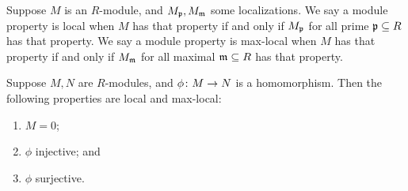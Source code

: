 \begin{definition}
    Suppose \(M\) is an \(R\)-module, and \(M_{\mathfrak{p}},M_{\mathfrak{m}}\) some localizations.
    We say a module property is local when
    \(M\) has that property if and only if \(M_{\mathfrak{p}}\) for all prime \(\mathfrak{p} \subseteq R\) has that property.
    We say a module property is max-local when
    \(M\) has that property if and only if \(M_{\mathfrak{m}}\) for all maximal \(\mathfrak{m} \subseteq R\) has that property.
\end{definition}
\begin{lemma}\label{lem:local-max-local}
    Suppose \(M,N\) are \(R\)-modules, and \(\phi\colon M\to N\) is a homomorphism.
    Then the following properties are local and max-local:
    \begin{enumerate}[label={(\alph*)}, itemsep=0mm]
        \item \(M = 0\);
        \item \(\phi\) injective; and
        \item \(\phi\) surjective.
    \end{enumerate}
\end{lemma}
